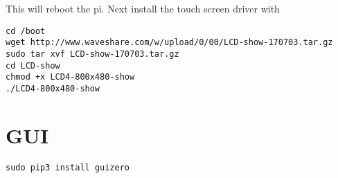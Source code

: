 This will reboot the pi. Next install the touch screen driver with

\begin{lstlisting}
cd /boot
wget http://www.waveshare.com/w/upload/0/00/LCD-show-170703.tar.gz
sudo tar xvf LCD-show-170703.tar.gz 
cd LCD-show
chmod +x LCD4-800x480-show
./LCD4-800x480-show
\end{lstlisting}

\section{GUI}

\begin{lstlisting}
sudo pip3 install guizero
\end{lstlisting}

